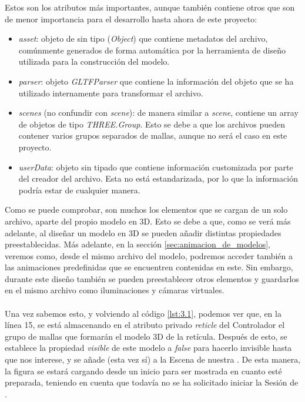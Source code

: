 \documentclass{subfiles}
\begin{document}
        Estos son los atributos más importantes, aunque también contiene otros que son de menor importancia para el desarrollo hasta ahora de este proyecto: 

        \begin{itemize}
            \item \textit{asset}: objeto de \js sin tipo (\textit{Object}) que contiene metadatos del archivo, comúnmente generados de forma automática por la herramienta de diseño utilizada para la construcción del modelo.
            \item \textit{parser}: objeto \textit{GLTFParser} que contiene la información del objeto que se ha utilizado internamente para transformar el archivo.
            \item \textit{scenes} (no confundir con \textit{scene}): de manera similar a \textit{scene}, contiene un array de objetos de tipo \textit{THREE.Group}. Esto se debe a que los archivos \gltf pueden contener varios grupos separados de mallas, aunque no será el caso en este proyecto.
            \item \textit{userData}: objeto sin tipado que contiene información customizada por parte del creador del archivo. Esta no está estandarizada, por lo que la información podría estar de cualquier manera.
        \end{itemize}

        Como se puede comprobar, son muchos los elementos que se cargan de un solo archivo, aparte del propio modelo en 3D. Esto se debe a que, como se verá más adelante, al diseñar un modelo en 3D se pueden añadir distintas propiedades preestablecidas. Más adelante, en la sección \ref{sec:animacion_de_modelos}, veremos como, desde el mismo archivo del modelo, podremos acceder también a las animaciones predefinidas que se encuentren contenidas en este. Sin embargo, durante este diseño también se pueden preestablecer otros elementos y guardarlos en el mismo archivo como iluminaciones y cámaras virtuales.

        \paragraph{}
        Una vez sabemos esto, y volviendo al código \ref{lst:3.1}, podemos ver que, en la línea 15, se está almacenando en el atributo privado \textit{reticle} del Controlador el grupo de mallas que formarán el modelo 3D de la retícula. Después de esto, se establece la propiedad \textit{visible} de este modelo a \textit{false} para hacerlo invisible hasta que nos interese, y se añade (esta vez sí) a la Escena de nuestra \ra. De esta manera, la figura se estará cargando desde un inicio para ser mostrada en cuanto esté preparada, teniendo en cuenta que todavía no se ha solicitado iniciar la Sesión de \ra.
\end{document}
